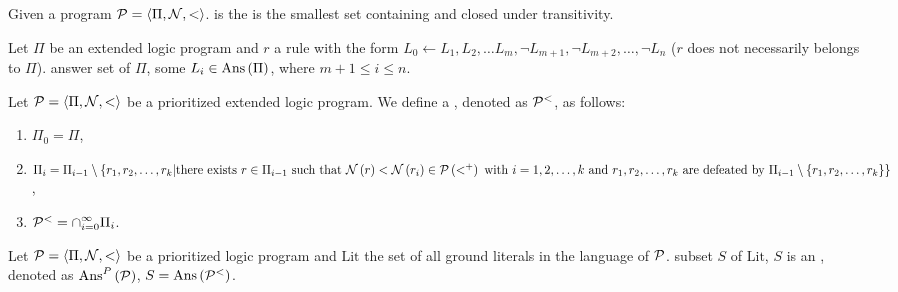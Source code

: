 \begin{defi}
Given a program $\mathcal{P}=\left\langle \Pi,\mathcal{N},<\right\rangle$. \fun{\calP}{<^+} is the  \iffTx{} \fun{\calP}{<^+} is the smallest set containing \fun{\calP}{<} and closed under transitivity.
\cite{conf/ijcai/ZhangF97}
\end{defi}

\begin{defi}
Let $\Pi$ be an extended logic program and $r$ a rule with the form $L_0\leftarrow L_1,L_2,\ldots L_m,\neg L_{m+1},\neg L_{m+2},\ldots,\neg L_n$ ($r$ does not necessarily belongs to $\Pi$).  \iffTx{} \fanTx{} answer set  of $\Pi$, \teTx{} some $L_i\in\mbox{Ans}\left(\Pi\right)$, where $m+1\leq i\leq n$.
\cite{conf/ijcai/ZhangF97}
\end{defi}

\begin{defi}
Let $\mathcal{P}=\left\langle \Pi,\mathcal{N},<\right\rangle$ be a prioritized extended logic program. We define a , denoted as $\mathcal{P}^{<}$, as follows:
\begin{enumerate}
 \item $\Pi_0=\Pi$,
 \item $\Pi_i=\Pi_{i-1}\setminus\left\{ r_1,r_2,\ldots,r_k|\mbox{there exists{} }r\in\Pi_{i-1}\mbox{ such that{} }\mathcal{N}\left(r\right)<\mathcal{N}\left(r_i\right)\in\mathcal{P}\left(<^+\right)\mbox{ with }i=1,2,\ldots,k\mbox{ and }r_1,r_2,\ldots,r_k\mbox{ are defeated by }\Pi_{i-1}\setminus\left\{ r_1,r_2,\ldots,r_k\right\}\right\}$,
 \item $\mathcal{P}^<=\displaystyle\cap_{i=0}^{\infty}\Pi_i$.
\end{enumerate}
\cite{conf/ijcai/ZhangF97}
\end{defi}

\begin{defi}
Let $\mathcal{P}=\left\langle \Pi,\mathcal{N},<\right\rangle$ be a prioritized logic program and $\mbox{Lit}$ the set of all ground literals in the language of $\mathcal{P}$. \fanTx{} subset $S$ of $\mbox{Lit}$, $S$ is an , denoted as $\mbox{Ans}^P\left(\mathcal{P}\right)$, \iffTx{} $S=\mbox{Ans}\left(\mathcal{P}^<\right)$.
\cite{conf/ijcai/ZhangF97}
\end{defi}

